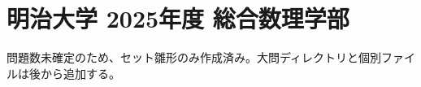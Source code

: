 \documentclass[../../uem_mei_q.tex]{subfiles}
\begin{document}
    \section{明治大学 2025年度 総合数理学部}

    問題数未確定のため、セット雛形のみ作成済み。大問ディレクトリと個別ファイルは後から追加する。
\end{document}
